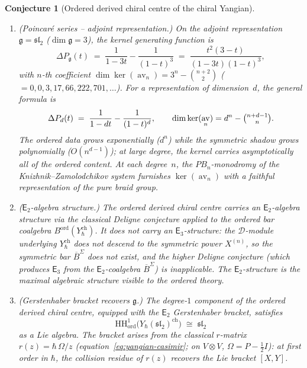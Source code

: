 \documentclass[11pt,reqno]{amsart}
\newtheorem{conjecture}[theorem]{Conjecture}
\theoremstyle{definition}
\theoremstyle{remark}
\newcommand{\cD}{\mathcal{D}}
\newcommand{\HH}{\mathrm{HH}}
\newcommand{\Etwo}{\mathsf{E}_{2}}
\providecommand{\Ethree}{\mathsf{E}_{3}}
\DeclareMathOperator{\av}{av}
\newcommand{\fg}{\mathfrak{g}}
\newcommand{\BarSig}{\overline{B}^{\Sigma}}
\numberwithin{equation}{section}
\begin{document}
\begin{conjecture}[Ordered derived chiral centre of the
chiral Yangian]
\begin{enumerate}[label=\textup{(\roman*)}]
\item \textup{(Poincar\'e series -- adjoint
  representation.)}
  On the adjoint representation $\fg = \mathfrak{sl}_2$
  \textup{(}$\dim \fg = 3$\textup{)}, the kernel
  generating function is
  \begin{equation}\label{eq:conj-kernel-gf-adj}
    \Delta P_\fg(t)
    \;=\; \frac{1}{1 - 3t}
      - \frac{1}{(1-t)^3}
    \;=\; \frac{t^2(3 - t)}{(1 - 3t)(1-t)^3},
  \end{equation}
  with $n$-th coefficient
  $\dim\ker(\av_n) = 3^n - \binom{n+2}{2}$
  \textup{(}$= 0, 0, 3, 17, 66, 222, 701,
  \ldots$\textup{)}.
  For a representation of dimension~$d$, the general
  formula is
  \begin{equation}\label{eq:conj-kernel-gf-general}
    \Delta P_d(t)
    \;=\; \frac{1}{1 - dt} - \frac{1}{(1-t)^d},
    \qquad
    \dim\ker(\av_n)
    = d^n - \tbinom{n + d - 1}{n}.
  \end{equation}
  The ordered data grows exponentially ($d^n$) while
  the symmetric shadow grows polynomially
  ($O(n^{d-1})$); at large degree, the kernel
  carries asymptotically all of the ordered content.
  At each degree~$n$, the $PB_n$-monodromy of the
  Knizhnik--Zamolodchikov system furnishes
  $\ker(\av_n)$ with a faithful representation of the
  pure braid group.

\item \textup{($\Etwo$-algebra structure.)}
  The ordered derived chiral centre carries an
  $\Etwo$-algebra structure via the classical Deligne
  conjecture applied to the ordered bar coalgebra
  $B^{\mathrm{ord}}(Y_\hbar^{\mathrm{ch}})$. It does
  \emph{not} carry an $\Ethree$-structure: the
  $\cD$-module underlying $Y_\hbar^{\mathrm{ch}}$ does
  not descend to the symmetric power $X^{(n)}$, so
  the symmetric bar $\BarSig$ does not exist, and the
  higher Deligne conjecture
  \textup{(}which produces $\Ethree$ from the
  $\Etwo$-coalgebra $\BarSig$\textup{)} is
  inapplicable. The $\Etwo$-structure is the maximal
  algebraic structure visible to the ordered theory.

\item \textup{(Gerstenhaber bracket recovers $\fg$.)}
  The degree-$1$ component of the ordered derived
  chiral centre, equipped with the $\Etwo$ Gerstenhaber
  bracket, satisfies
  \[
    \HH^1_{\mathrm{ord}}\bigl(
      Y_\hbar(\mathfrak{sl}_2)^{\mathrm{ch}}\bigr)
    \;\cong\; \mathfrak{sl}_2
  \]
  as a Lie algebra. The bracket arises from the
  classical $r$-matrix $r(z) = \hbar\,\Omega/z$
  (equation~\eqref{eq:yangian-casimir}; on
  $V \otimes V$, $\Omega = P - \tfrac{1}{2}I$):
  at first order in $\hbar$, the collision residue
  of $r(z)$ recovers the Lie bracket $[X,Y]$.


\end{enumerate}
\end{conjecture}
\end{document}
